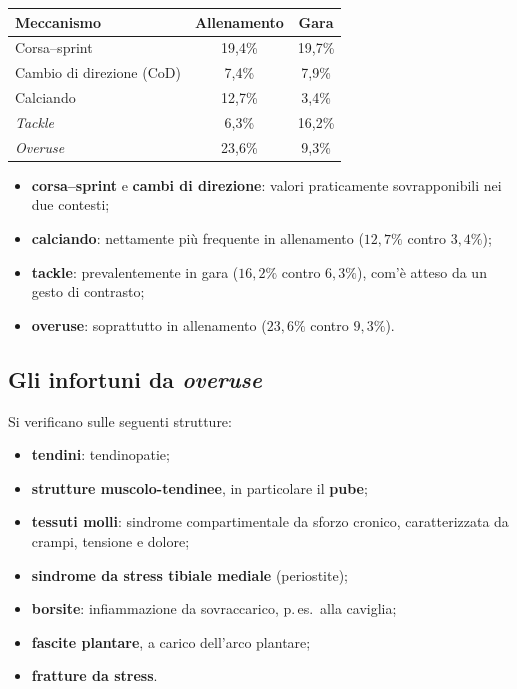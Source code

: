 \begin{table}[htbp]
  \centering
  \small
  \renewcommand{\arraystretch}{1.3}
  \begin{tabularx}{\textwidth}{|X|c|c|}
    \hline
    \textbf{Meccanismo} & \textbf{Allenamento} & \textbf{Gara} \\
    \hline
    Corsa--sprint & 19,4\% & 19,7\% \\
    \hline
    Cambio di direzione (CoD) & 7,4\% & 7,9\% \\
    \hline
    Calciando & 12,7\% & 3,4\% \\
    \hline
    \textit{Tackle} & 6,3\% & 16,2\% \\
    \hline
    \textit{Overuse} & 23,6\% & 9,3\% \\
    \hline
  \end{tabularx}
\end{table}

\begin{itemize}
  \item \textbf{corsa--sprint} e \textbf{cambi di direzione}: valori praticamente sovrapponibili nei
    due contesti;
  \item \textbf{calciando}: nettamente più frequente in allenamento ($12,7\%$ contro $3,4\%$);
  \item \textbf{tackle}: prevalentemente in gara ($16,2\%$ contro $6,3\%$), com'è atteso da un gesto
    di contrasto;
  \item \textbf{overuse}: soprattutto in allenamento ($23,6\%$ contro $9,3\%$).
\end{itemize}

\subsection{Gli infortuni da \textit{overuse}}

Si verificano sulle seguenti strutture:

\begin{itemize}
  \item \textbf{tendini}: tendinopatie;
  \item \textbf{strutture muscolo-tendinee}, in particolare il \textbf{pube};
  \item \textbf{tessuti molli}: sindrome compartimentale da sforzo cronico, caratterizzata da
    crampi, tensione e dolore;
  \item \textbf{sindrome da stress tibiale mediale} (periostite);
  \item \textbf{borsite}: infiammazione da sovraccarico, p.\,es.\ alla caviglia;
  \item \textbf{fascite plantare}, a carico dell'arco plantare;
  \item \textbf{fratture da stress}.
\end{itemize}

